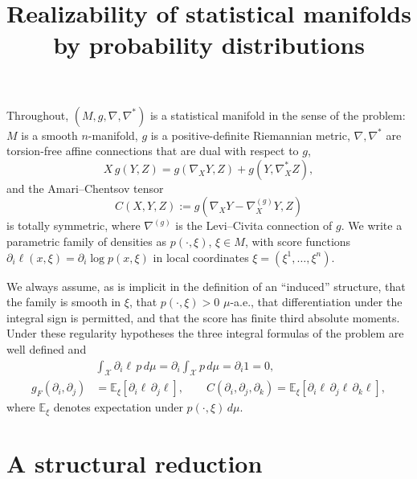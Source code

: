 \documentclass{amsart}
\theoremstyle{definition}
\theoremstyle{remark}
\begin{document}
\title{Realizability of statistical manifolds by probability distributions}
\maketitle

Throughout, $(M,g,\nabla,\nabla^{*})$ is a statistical manifold in the sense of
the problem: $M$ is a smooth $n$-manifold, $g$ is a positive-definite
Riemannian metric, $\nabla,\nabla^{*}$ are torsion-free affine connections
that are dual with respect to $g$,
\begin{equation}\label{eq:dual}
  X\,g(Y,Z)=g(\nabla_{X}Y,Z)+g(Y,\nabla^{*}_{X}Z),
\end{equation}
and the Amari--Chentsov tensor
\begin{equation}\label{eq:ACdef}
  C(X,Y,Z):=g(\nabla_{X}Y-\nabla^{(g)}_{X}Y,Z)
\end{equation}
is totally symmetric, where $\nabla^{(g)}$ is the Levi--Civita connection of $g$.
We write a parametric family of densities as $p(\cdot,\xi)$, $\xi\in M$, with
score functions $\partial_{i}\ell(x,\xi)=\partial_{i}\log p(x,\xi)$ in local
coordinates $\xi=(\xi^{1},\dots,\xi^{n})$.

We always assume, as is implicit in the definition of an ``induced'' structure,
that the family is smooth in $\xi$, that $p(\cdot,\xi)>0$ $\mu$-a.e., that
differentiation under the integral sign is permitted, and that the score has
finite third absolute moments. Under these regularity hypotheses the three
integral formulas of the problem are well defined and
\begin{align}
  &\int_{\mathcal X}\partial_{i}\ell\,p\,d\mu=\partial_{i}\!\int_{\mathcal X}p\,d\mu
    =\partial_{i}1=0,\label{eq:scoremean}\\
  g_{F}(\partial_{i},\partial_{j})&=\mathbb E_{\xi}\!\left[\partial_{i}\ell\,
    \partial_{j}\ell\right],\qquad
  C(\partial_{i},\partial_{j},\partial_{k})
    =\mathbb E_{\xi}\!\left[\partial_{i}\ell\,\partial_{j}\ell\,\partial_{k}\ell\right],
    \label{eq:gC}
\end{align}
where $\mathbb E_{\xi}$ denotes expectation under $p(\cdot,\xi)\,d\mu$.

\section{A structural reduction}
\end{document}
